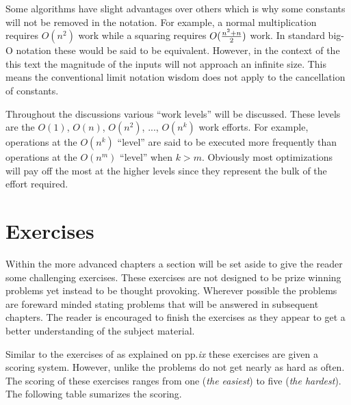\documentclass[b5paper]{book}
\begin{document}
Some algorithms have slight advantages over others which is why some constants will not be removed in 
the notation.  For example, a normal multiplication requires $O(n^2)$ work while a squaring requires 
$O({{n^2 + n}\over 2})$ work.  In standard big-O notation these would be said to be equivalent.  However, in the 
context of the this text the magnitude of the inputs will not approach an infinite size.  This means the conventional limit 
notation wisdom does not apply to the cancellation of constants.

Throughout the discussions various ``work levels'' will be discussed.  These levels are the $O(1)$,
$O(n)$, $O(n^2)$, ..., $O(n^k)$ work efforts.  For example, operations at the $O(n^k)$ ``level'' are said to be
executed more frequently than operations at the $O(n^m)$ ``level'' when $k > m$.  Obviously most optimizations will pay
off the most at the higher levels since they represent the bulk of the effort required.  

\section{Exercises}
Within the more advanced chapters a section will be set aside to give the reader some challenging exercises.  These exercises are not 
designed to be prize winning problems yet instead to be thought provoking.  Wherever possible the problems are foreward minded stating 
problems that will be answered in subsequent chapters.  The reader is encouraged to finish the exercises as they appear to get a 
better understanding of the subject material.  

Similar to the exercises of \cite{TAOCPV2} as explained on pp.\textit{ix} these exercises are given a scoring system.  However, unlike 
\cite{TAOCPV2} the problems do not get nearly as hard as often.  The scoring of these exercises ranges from one (\textit{the easiest}) to
five (\textit{the hardest}).  The following table sumarizes the scoring.
\end{document}
